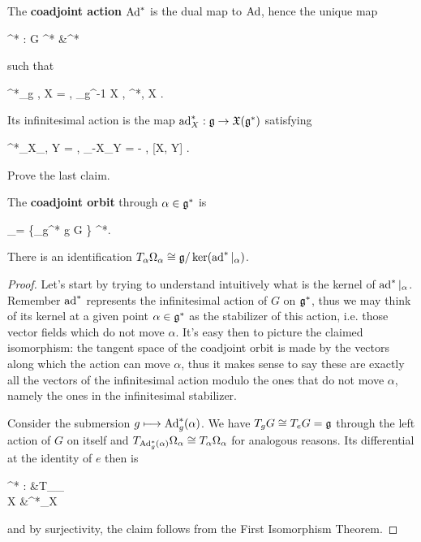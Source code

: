 \begin{definition}
	The \textbf{coadjoint action} $\operatorname{Ad}^*$ is the dual map to $\operatorname{Ad}$, hence the unique map
	\begin{eqalign}
		\Ad^* : G \times \lalg^* &\longto \lalg^*
	\end{eqalign}
	such that
	\begin{eqalign}
		\langle \Ad^*_g \alpha, X \rangle = \langle \alpha, \Ad_{g^{-1}} X \rangle, \quad \forall \alpha \in \lalg^*, X \in \lalg.
	\end{eqalign}
	Its infinitesimal action is the map $\operatorname{ad}^*_X : \mathfrak g \to \mathfrak{X}(\mathfrak g^*)$ satisfying
	\begin{eqalign}
		\langle \ad^*_X\vert_\alpha, Y \rangle = \langle \alpha, \ad_{-X}\vert_Y \rangle = - \langle \alpha, [X, Y] \rangle.
	\end{eqalign}
\end{definition}

\begin{exercise}
	Prove the last claim.
\end{exercise}

\begin{definition}
	The \textbf{coadjoint orbit} through $\alpha \in \mathfrak g^*$ is
	\begin{eqalign}
		\Omega_\alpha = \{\Ad_g^* \alpha \suchthat g \in G \} \subseteq \lalg^*.
	\end{eqalign}
\end{definition}

\begin{theorem}
\label{th:coadj_is_tangent}
	There is an identification $T_\alpha \Omega_\alpha \overset{}{\cong} \mathfrak g / \ker (\operatorname{ad}^*\vert_\alpha)$.
\end{theorem}
\begin{proof}
	Let's start by trying to understand intuitively what is the kernel of $\operatorname{ad}^*\vert_\alpha$. Remember $\operatorname{ad}^*$ represents the infinitesimal action of $G$ on $\mathfrak g^*$, thus we may think of its kernel at a given point $\alpha \in \mathfrak g^*$ as the stabilizer of this action, i.e. those vector fields which do not move $\alpha$. It's easy then to picture the claimed isomorphism: the tangent space of the coadjoint orbit is made by the vectors along which the action can move $\alpha$, thus it makes sense to say these are exactly all the vectors of the infinitesimal action modulo the ones that do not move $\alpha$, namely the ones in the infinitesimal stabilizer.

	Consider the submersion $g \longmapsto \operatorname{Ad}_g^*(\alpha)$. We have $T_g G \overset{}{\cong} T_e G = \mathfrak g$ through the left action of $G$ on itself and $T_{\operatorname{Ad}_g^*(\alpha)}\Omega_\alpha \overset{}{\cong} T_\alpha \Omega_\alpha$ for analogous reasons.
	Its differential at the identity of $e$ then is
	\begin{eqalign}
		\ad^* : \lalg &\longto T_\alpha \Omega_\alpha\\
		X &\longmapsto \ad^*_X
	\end{eqalign}
	and by surjectivity, the claim follows from the First Isomorphism Theorem.
\end{proof}

